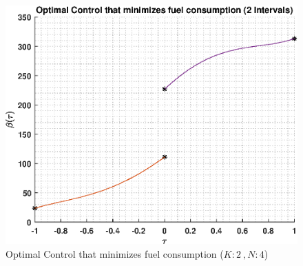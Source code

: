 \documentclass[]{article}
\begin{document}
\begin{figure}
	\centering
	\includegraphics[scale=0.75]{directControlK2Poly4.eps}
	\caption{Optimal Control that minimizes fuel consumption (\(K:2\ , N:4\))}
	\label{fig:directControlK2Poly4}
\end{figure}
\FloatBarrier
\end{document}
